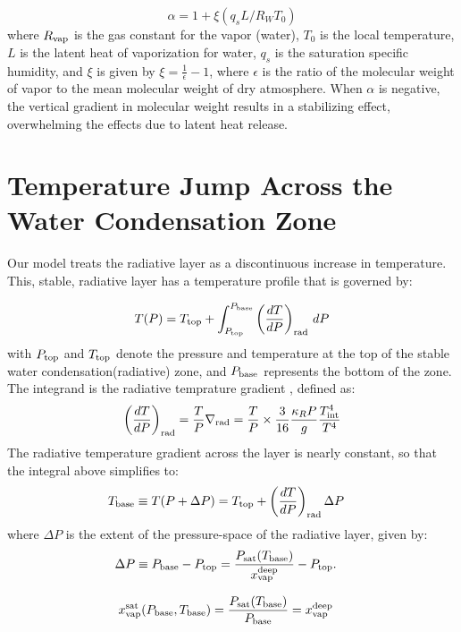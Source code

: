 \documentclass[11pt]{ucscthesisbs}
\begin{document}
\begin{equation}
  \alpha = 1 + \xi (q_{s} L / R_{W} T_{0}) 
  \label{eq:alpha}
\end{equation}
where $R_{\rm vap}$ is the gas constant for the vapor (water), $T_{0}$ is the local temperature, $L$ is the latent heat of vaporization for water, $q_{s}$ is the saturation specific humidity, and $\xi$ is given by $\xi = \frac{1}{\epsilon} - 1$, where $\epsilon$ is the ratio of the molecular weight of vapor to the mean molecular weight of dry atmosphere. When $\alpha$ is negative, the vertical gradient in molecular weight results in a stabilizing effect, overwhelming the effects due to latent heat release.

\section{Temperature Jump Across the Water Condensation Zone}
Our model treats the radiative layer as a discontinuous increase in temperature. This, stable, radiative layer has a temperature profile that is governed by:

\begin{equation}
  T(P) = T_{\rm top} + \int_{P_{\rm top}}^{P_{\rm base}} \left(\frac{dT}{dP}\right)_{\rm rad}\,d P
\end{equation}
with $P_{\rm top}$ and $T_{\rm top}$ denote the pressure and temperature at the top of the stable water condensation(radiative) zone, and $P_{\rm base}$ represents the bottom of the zone. The integrand is the radiative temprature gradient \citep{leconte_2017}, defined as:
\begin{align}
  \left(\frac{dT}{dP}\right)_{\rm rad}=\frac{T}{P}\nabla_{\rm rad}
  = \frac{T}{P}\times\frac{3}{16}\frac{\kappa_R P}{g}\frac{T_{\rm int}^4}{T^4}
\end{align}
The radiative temperature gradient across the layer is nearly constant, so that the integral above simplifies to:
\begin{align}
T_{\rm base}\equiv T(P+\Delta P) &= T_{\rm top} + \left(\frac{dT}{dP}\right)_{\rm rad}\Delta P
\end{align}
where $\Delta P$ is the extent of the pressure-space of the radiative layer, given by:
\begin{align}
\Delta P \equiv P_{\rm base}-P_{\rm top} &= \frac{P_{\rm sat}(T_{\rm base})}{x_{\rm vap}^{\rm deep}} - P_{\rm top}.
\end{align}

\begin{align}
x_{\rm vap}^{\rm sat}(P_{\rm base}, T_{\rm base}) &= \frac{P_{\rm sat}(T_{\rm base})}{P_{\rm base}}=x_{\rm vap}^{\rm deep}
\end{align}
\end{document}

